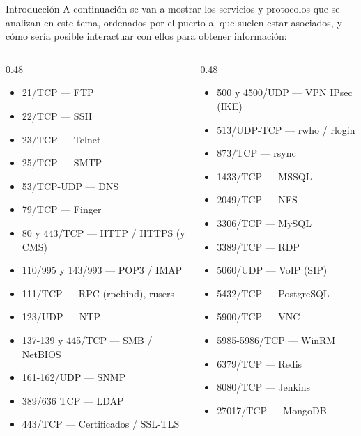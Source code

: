 \documentclass[aspectratio=169,11pt]{beamer}
\begin{document}
\begin{frame}{Introducción}
\footnotesize
A continuación se van a mostrar los servicios y protocolos que se analizan en este tema, ordenados por el puerto al que suelen estar asociados, y cómo sería posible interactuar con ellos para obtener información:
\vspace{1ex}

\scriptsize
\setlength{\itemsep}{0pt}
\begin{columns}[t]
\begin{column}{0.48\textwidth}
\begin{itemize}\setlength{\itemsep}{0pt}
  \item 21/TCP --- FTP
  \item 22/TCP --- SSH
  \item 23/TCP --- Telnet
  \item 25/TCP --- SMTP
  \item 53/TCP-UDP --- DNS
  \item 79/TCP --- Finger
  \item 80 y 443/TCP --- HTTP / HTTPS (y CMS)
  \item 110/995 y 143/993 --- POP3 / IMAP
  \item 111/TCP --- RPC (rpcbind), rusers
  \item 123/UDP --- NTP
  \item 137-139 y 445/TCP --- SMB / NetBIOS
  \item 161-162/UDP --- SNMP
  \item 389/636 TCP --- LDAP
  \item 443/TCP --- Certificados / SSL-TLS
\end{itemize}
\end{column}
\begin{column}{0.48\textwidth}
\begin{itemize}\setlength{\itemsep}{0pt}
  \item 500 y 4500/UDP --- VPN IPsec (IKE)
  \item 513/UDP-TCP --- rwho / rlogin
  \item 873/TCP --- rsync
  \item 1433/TCP --- MSSQL
  \item 2049/TCP --- NFS
  \item 3306/TCP --- MySQL
  \item 3389/TCP --- RDP
  \item 5060/UDP --- VoIP (SIP)
  \item 5432/TCP --- PostgreSQL
  \item 5900/TCP --- VNC
  \item 5985-5986/TCP --- WinRM
  \item 6379/TCP --- Redis
  \item 8080/TCP --- Jenkins
  \item 27017/TCP --- MongoDB
\end{itemize}
\end{column}
\end{columns}
\end{frame}
\end{document}
